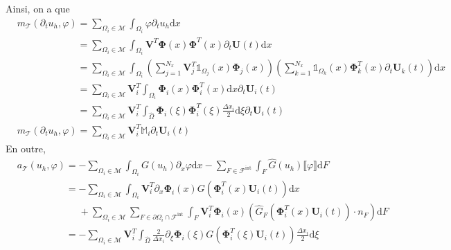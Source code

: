 \documentclass[11pt, a4paper, oneside]{report}
\begin{document}
\begin{appendices}
Ainsi, on a que
\begin{equation}
    \begin{aligned}
        &m_\mathcal{T}(\partial_t u_h, \varphi) = \sum_{\Omega_i \in \mathcal{M}} \int_{\Omega_i} \varphi \partial_t u_h \text{d}x \\
        &\phantom{m_\mathcal{T}(\partial_t u_h, \varphi) } = \sum_{\Omega_i \in \mathcal{M}} \int_{\Omega_i} \bm{V}^T \bm{\Phi}(x) \bm{\Phi}^T(x) \partial_t \bm{U}(t) \text{d}x \\
        &\phantom{m_\mathcal{T}(\partial_t u_h, \varphi) } = \sum_{\Omega_i \in \mathcal{M}} \int_{\Omega_i} \left( \sum_{j = 1}^{N_x} \bm{V}_j^T \mathds{1}_{\Omega_j}(x) \bm{\Phi}_j(x) \right) \left( \sum_{k = 1}^{N_x} \mathds{1}_{\Omega_k}(x) \bm{\Phi}_k^T(x) \partial_t \bm{U}_k(t) \right) \text{d}x \\
        &\phantom{m_\mathcal{T}(\partial_t u_h, \varphi) } = \sum_{\Omega_i \in \mathcal{M}} \bm{V}_i^T \int_{\Omega_i} \bm{\Phi}_i(x) \bm{\Phi}_i^T(x) \text{d}x \partial_t \bm{U}_i(t) \\
        &\phantom{m_\mathcal{T}(\partial_t u_h, \varphi) } = \sum_{\Omega_i \in \mathcal{M}} \bm{V}_i^T \int_{\widehat{\Omega}} \bm{\Phi}_i(\xi) \bm{\Phi}_i^T(\xi) \frac{\Delta x_i}{2} \text{d}\xi \partial_t \bm{U}_i(t) \\
        &m_\mathcal{T}(\partial_t u_h, \varphi) = \sum_{\Omega_i \in \mathcal{M}} \bm{V}_i^T \mathbb{M}_i \partial_t \bm{U}_i(t)
    \end{aligned}
\end{equation}
\noindent
En outre,
\begin{equation}
    \begin{aligned}
        &a_\mathcal{T}(u_h, \varphi) = -\sum_{\Omega_i \in \mathcal{M}} \int_{\Omega_i} G(u_h) \partial_x \varphi \text{d}x - \sum_{F \in \mathcal{F}^\text{int}} \int_F \widehat{G}(u_h) \llbracket \varphi \rrbracket \text{d}F \\
        &\phantom{a_\mathcal{T}(u_h, \varphi) } = -\sum_{\Omega_i \in \mathcal{M}} \int_{\Omega_i} \bm{V}_i^T \partial_x \bm{\Phi}_i(x) G \left( \bm{\Phi}_i^T(x) \bm{U}_i(t) \right) \text{d}x \\
        &\phantom{a_\mathcal{T}(u_h, \varphi) =} +\sum_{\Omega_i \in \mathcal{M}} \sum_{F \in \partial \Omega_i \cap \mathcal{F}^\text{int}} \int_F \bm{V}_i^T \bm{\Phi}_i(x) \left( \widehat{G}_F \left( \bm{\Phi}_i^T(x) \bm{U}_i(t) \right) \cdot n_F \right) \text{d}F \\
        &\phantom{a_\mathcal{T}(u_h, \varphi) } = -\sum_{\Omega_i \in \mathcal{M}} \bm{V}_i^T \int_{\widehat{\Omega}} \frac{2}{\Delta x_i} \partial_\xi \bm{\Phi}_i(\xi) G \left( \bm{\Phi}_i^T(\xi) \bm{U}_i(t) \right) \frac{\Delta x_i}{2} \text{d}\xi \\

\end{aligned}
\end{equation}
\end{appendices}
\end{document}

